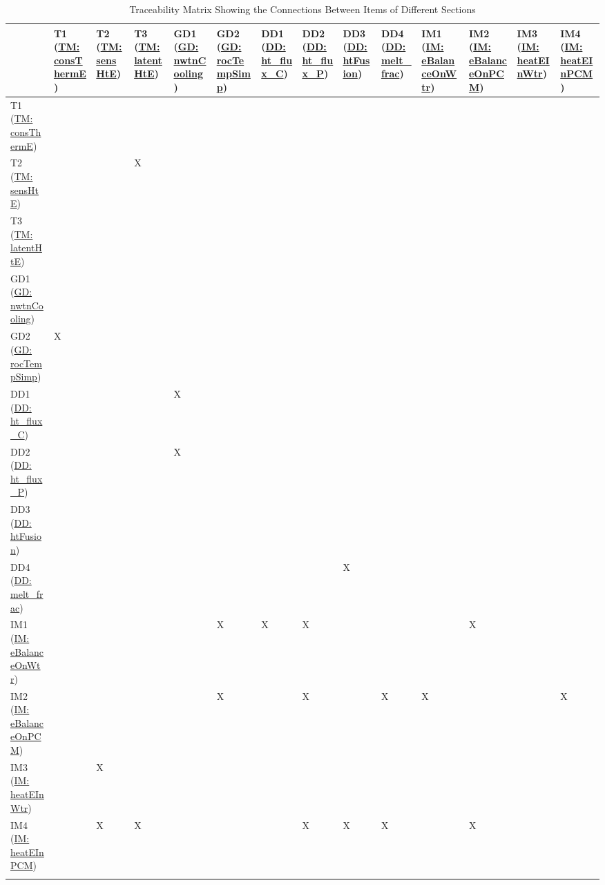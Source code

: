 \documentclass[12pt]{article}
\begin{document}
\begin{longtable}{l l l l l l l l l l l l l l}
\toprule
 & T1 (\hyperref[TM:consThermE]{TM: consThermE}) & T2 (\hyperref[TM:sensHtE]{TM: sensHtE}) & T3 (\hyperref[TM:latentHtE]{TM: latentHtE}) & GD1 (\hyperref[GD:nwtnCooling]{GD: nwtnCooling}) & GD2 (\hyperref[GD:rocTempSimp]{GD: rocTempSimp}) & DD1 (\hyperref[DD:ht.flux.C]{DD: ht\_flux\_C}) & DD2 (\hyperref[DD:ht.flux.P]{DD: ht\_flux\_P}) & DD3 (\hyperref[DD:htFusion]{DD: htFusion}) & DD4 (\hyperref[DD:melt.frac]{DD: melt\_frac}) & IM1 (\hyperref[IM:eBalanceOnWtr]{IM: eBalanceOnWtr}) & IM2 (\hyperref[IM:eBalanceOnPCM]{IM: eBalanceOnPCM}) & IM3 (\hyperref[IM:heatEInWtr]{IM: heatEInWtr}) & IM4 (\hyperref[IM:heatEInPCM]{IM: heatEInPCM})
\\
\midrule
T1 (\hyperref[TM:consThermE]{TM: consThermE}) &  &  &  &  &  &  &  &  &  &  &  &  & 
\\
T2 (\hyperref[TM:sensHtE]{TM: sensHtE}) &  &  & X &  &  &  &  &  &  &  &  &  & 
\\
T3 (\hyperref[TM:latentHtE]{TM: latentHtE}) &  &  &  &  &  &  &  &  &  &  &  &  & 
\\
GD1 (\hyperref[GD:nwtnCooling]{GD: nwtnCooling}) &  &  &  &  &  &  &  &  &  &  &  &  & 
\\
GD2 (\hyperref[GD:rocTempSimp]{GD: rocTempSimp}) & X &  &  &  &  &  &  &  &  &  &  &  & 
\\
DD1 (\hyperref[DD:ht.flux.C]{DD: ht\_flux\_C}) &  &  &  & X &  &  &  &  &  &  &  &  & 
\\
DD2 (\hyperref[DD:ht.flux.P]{DD: ht\_flux\_P}) &  &  &  & X &  &  &  &  &  &  &  &  & 
\\
DD3 (\hyperref[DD:htFusion]{DD: htFusion}) &  &  &  &  &  &  &  &  &  &  &  &  & 
\\
DD4 (\hyperref[DD:melt.frac]{DD: melt\_frac}) &  &  &  &  &  &  &  & X &  &  &  &  & 
\\
IM1 (\hyperref[IM:eBalanceOnWtr]{IM: eBalanceOnWtr}) &  &  &  &  & X & X & X &  &  &  & X &  & 
\\
IM2 (\hyperref[IM:eBalanceOnPCM]{IM: eBalanceOnPCM}) &  &  &  &  & X &  & X &  & X & X &  &  & X
\\
IM3 (\hyperref[IM:heatEInWtr]{IM: heatEInWtr}) &  & X &  &  &  &  &  &  &  &  &  &  & 
\\
IM4 (\hyperref[IM:heatEInPCM]{IM: heatEInPCM}) &  & X & X &  &  &  & X & X & X &  & X &  & 
\\
\bottomrule
\caption{Traceability Matrix Showing the Connections Between Items of Different Sections}
\label{Table:Tracey2}
\end{longtable}
\end{document}

